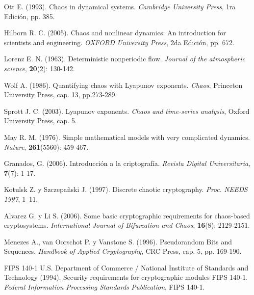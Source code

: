 \begin{thebibliography}{00}
Ott E. (1993).
\newblock Chaos in dynamical systems.
\newblock \emph{Cambridge University Press}, 1ra Edición, pp. 385.

Hilborn R. C. (2005).
\newblock Chaos and nonlinear dynamics: An introduction for scientists and engineering.
\newblock \emph{OXFORD University Press}, 2da Edición, pp. 672.

Lorenz E. N. (1963).
\newblock Deterministic nonperiodic flow.
\newblock \emph{Journal of the atmospheric science}, \textbf{20}(2): 130-142.

Wolf A. (1986).
\newblock Quantifying chaos with Lyapunov exponents.
\newblock \emph{Chaos}, Princeton University Press, cap. 13, pp.273-289.

Sprott J. C. (2003).
\newblock Lyapunov exponents.
\newblock \emph{Chaos and time-series analysis}, Oxford University Press, cap. 5.

May R. M. (1976).
\newblock Simple mathematical models with very complicated dynamics.
\newblock \emph{Nature}, \textbf{261}(5560): 459-467.

Granados, G. (2006).
\newblock Introducción a la criptografía.
\newblock \emph{Revista Digital Universitaria}, \textbf{7}(7): 1-17.

Kotulsk Z. y Szczepañski J. (1997).
\newblock Discrete chaotic cryptography.
\newblock \emph{Proc. NEEDS 1997}, 1–11.

Alvarez G. y Li S. (2006).
\newblock Some basic cryptographic requirements for chaos-based cryptosystems.
\newblock \emph{International Journal of Bifurcation and Chaos}, \textbf{16}(8): 2129-2151.

Menezes A., van Oorschot P. y Vanstone S. (1996).
\newblock Pseudorandom Bits and Sequences.
\newblock \emph{Handbook of Applied Cryptography}, CRC Press, cap. 5, pp. 169-190.

FIPS 140-1 U.S. Department of Commerce / National Institute of Standards and Technology (1994).
\newblock Security requirements for cryptographic modules FIPS 140-1.
\newblock \emph{Federal Information Processing Standards Publication}, FIPS 140-1.


\end{thebibliography}

